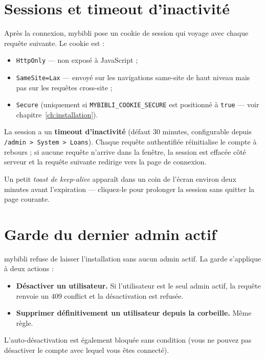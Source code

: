 \section{Sessions et timeout d'inactivité}

Après la connexion, mybibli pose un cookie de
session qui voyage avec chaque requête
suivante. Le cookie est :

\begin{itemize}
  \item \texttt{HttpOnly} — non exposé à JavaScript ;
  \item \texttt{SameSite=Lax} — envoyé sur les navigations
        same-site de haut niveau mais pas sur les requêtes
        cross-site ;
  \item \texttt{Secure} (uniquement si
        \texttt{MYBIBLI\_COOKIE\_SECURE} est positionné à
        \texttt{true} — voir chapitre~\ref{ch:installation}).
\end{itemize}

La session a un \textbf{timeout d'inactivité} (défaut 30 minutes, configurable depuis
\texttt{/admin > System > Loans}). Chaque requête authentifiée
réinitialise le compte à rebours ; si aucune requête n'arrive dans
la fenêtre, la session est effacée côté serveur et la requête
suivante redirige vers la page de connexion.

Un petit \emph{toast de keep-alive} apparaît dans un coin de l'écran
environ deux minutes avant l'expiration — cliquez-le pour
prolonger la session sans quitter la page courante.

\section{Garde du dernier admin actif}

mybibli refuse de laisser l'installation sans aucun admin actif.
La garde s'applique à deux actions :

\begin{itemize}
  \item \textbf{Désactiver un utilisateur.} Si l'utilisateur est le
        seul admin actif, la requête renvoie un 409 conflict et la
        désactivation est refusée.
  \item \textbf{Supprimer définitivement un utilisateur depuis la
        corbeille.} Même règle.
\end{itemize}

L'auto-désactivation est également bloquée sans condition (vous ne
pouvez pas désactiver le compte avec lequel vous êtes connecté).


